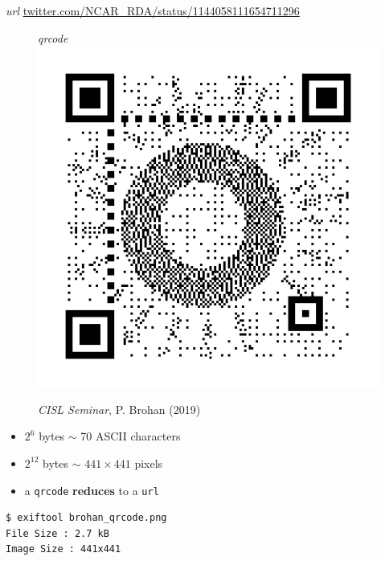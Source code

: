 \documentclass{beamer}
\begin{document}
\begin{frame}[fragile]
  \begin{beamerboxesrounded}{\textit{url}}
        \url{twitter.com/NCAR\_RDA/status/1144058111654711296}
  \end{beamerboxesrounded}

  \begin{minipage}[t]{0.43\linewidth}
      \begin{figure}
      \textit{qrcode}
          \includegraphics[width=\textwidth]{img/brohan_qrcode}
          \caption{
            \emph{CISL Seminar}, P. Brohan (2019)
          }
      \end{figure}
  \end{minipage}
  \begin{minipage}[t]{0.55\linewidth}
      \begin{example}
      \begin{itemize}
        \item $2^6$ bytes $\sim$ 70 ASCII characters
        \item $2^{12}$ bytes $\sim$ $441 \times 441$ pixels
        \item a \texttt{qrcode} \textbf{reduces} to a \texttt{url}
      \end{itemize}
    \end{example}

\begin{verbatim}
$ exiftool brohan_qrcode.png
File Size : 2.7 kB
Image Size : 441x441
\end{verbatim}
\end{minipage}
\end{frame}
\end{document}

